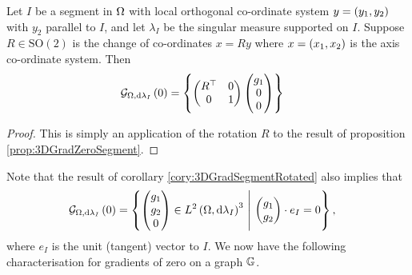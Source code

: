 
\begin{cory} \label{cory:3DGradSegmentRotated}
	Let $I$ be a segment in $\Omega$ with local orthogonal co-ordinate system  $y=\left( y_1,y_2 \right)$ with $y_2$ parallel to $I$, and let $\lambda_I$ be the singular measure supported on $I$.
	Suppose $R\in\mathrm{SO}(2)$ is the change of co-ordinates $x=Ry$ where $x=\left( x_1,x_2 \right)$ is the axis co-ordinate system.
	Then
	\begin{align*}
		\mathcal{G}_{ \Omega, \mathrm{d}\lambda_I}\left( 0 \right) &= 
		\left\{  \begin{pmatrix} R^\top & 0 \\ 0 & 1 \end{pmatrix} \begin{pmatrix} g_1 \\ 0 \\ 0 \end{pmatrix}  \right\}
	\end{align*}
\end{cory}
\begin{proof}
	This is simply an application of the rotation $R$ to the result of proposition \ref{prop:3DGradZeroSegment}.
\end{proof}
Note that the result of corollary \ref{cory:3DGradSegmentRotated} also implies that
\begin{align*}
	\mathcal{G}_{ \Omega, \mathrm{d}\lambda_I}\left( 0 \right) &= 
		\left\{  \begin{pmatrix} g_1 \\ g_2 \\ 0 \end{pmatrix}\in L^{2}\left( \Omega,\mathrm{d}\lambda_I \right)^3 \ \middle\vert \  \begin{pmatrix} g_1 \\ g_2 \end{pmatrix} \cdot e_I = 0  \right\},
\end{align*}
where $e_I$ is the unit (tangent) vector to $I$.
We now have the following characterisation for gradients of zero on a graph $\mathbb{G}$.

